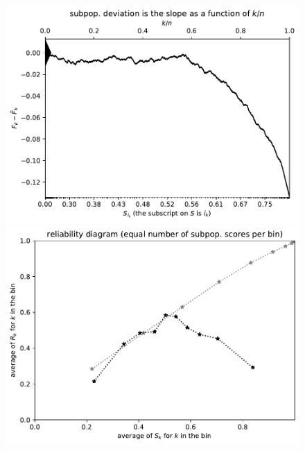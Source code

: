 \documentclass{article}
\begin{document}
\begin{figure}
\begin{centering}

\parbox{\imsize}{\includegraphics[width=\imsize]
{./codes/unweighted/prob-1-68-sidewinder-horned-rattlesnake-Crotalus-cerastes}}
\quad\quad
\parbox{\imsize}{\includegraphics[width=\imsize]
{./codes/unweighted/prob-1-68-sidewinder-horned-rattlesnake-Crotalus-cerastesequisamps10}}

\vspace{\vertsep}


\end{centering}
\end{figure}
\end{document}
